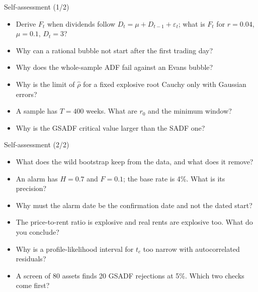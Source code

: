 \begin{frame}{Self-assessment (1/2)}
\itemsize{\small}
\begin{itemize}
    \item Derive $F_t$ when dividends follow $D_t = \mu + D_{t-1} + \varepsilon_t$; what is $F_t$ for $r = 0.04$, $\mu = 0.1$, $D_t = 3$?
    \item Why can a rational bubble not start after the first trading day?
    \item Why does the whole-sample ADF fail against an Evans bubble?
    \item Why is the limit of $\hat\rho$ for a fixed explosive root Cauchy only with Gaussian errors?
    \item A sample has $T = 400$ weeks. What are $r_0$ and the minimum window?
    \item Why is the GSADF critical value larger than the SADF one?
\end{itemize}
\end{frame}

\begin{frame}{Self-assessment (2/2)}
\itemsize{\small}
\begin{itemize}
    \item What does the wild bootstrap keep from the data, and what does it remove?
    \item An alarm has $H = 0.7$ and $F = 0.1$; the base rate is 4\%. What is its precision?
    \item Why must the alarm date be the confirmation date and not the dated start?
    \item The price-to-rent ratio is explosive and real rents are explosive too. What do you conclude?
    \item Why is a profile-likelihood interval for $t_c$ too narrow with autocorrelated residuals?
    \item A screen of 80 assets finds 20 GSADF rejections at 5\%. Which two checks come first?
\end{itemize}
\end{frame}

